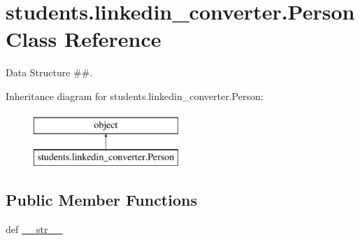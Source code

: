 \hypertarget{classstudents_1_1linkedin__converter_1_1_person}{\section{students.\-linkedin\-\_\-converter.\-Person Class Reference}
\label{classstudents_1_1linkedin__converter_1_1_person}
}


Data Structure \#\#.  


Inheritance diagram for students.\-linkedin\-\_\-converter.\-Person\-:\begin{figure}[H]
\begin{center}
\leavevmode
\includegraphics[height=2.000000cm]{classstudents_1_1linkedin__converter_1_1_person}
\end{center}
\end{figure}
\subsection*{Public Member Functions}
\begin{DoxyCompactItemize}
\item 
def \hyperlink{classstudents_1_1linkedin__converter_1_1_person_a76d56276758c7b0e878fddb0d2653db2}{\-\_\-\-\_\-str\-\_\-\-\_\-}
\end{DoxyCompactItemize}
